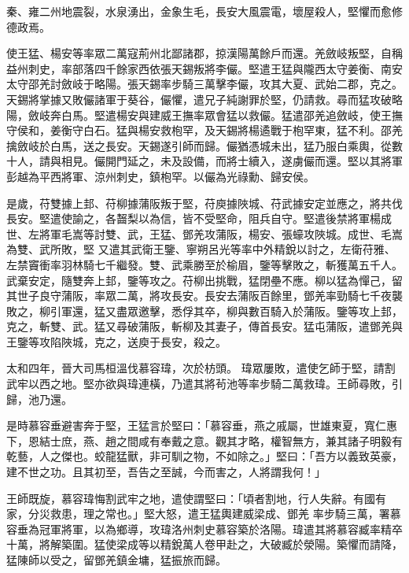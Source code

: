 \begin{pinyinscope}
 秦、雍二州地震裂，水泉湧出，金象生毛，長安大風震電，壞屋殺人，堅懼而愈修德政焉。



 使王猛、楊安等率眾二萬寇荊州北鄙諸郡，掠漢陽萬餘戶而還。羌斂岐叛堅，自稱益州刺史，率部落四千餘家西依張天錫叛將李儼。堅遣王猛與隴西太守姜衡、南安太守邵羌討斂岐于略陽。張天錫率步騎三萬擊李儼，攻其大夏、武始二郡，克之。天錫將掌據又敗儼諸軍于葵谷，儼懼，遣兄子純謝罪於堅，仍請救。尋而猛攻破略陽，斂岐奔白馬。堅遣楊安與建威王撫率眾會猛以救儼。猛遣邵羌追斂岐，使王撫
 守侯和，姜衡守白石。猛與楊安救枹罕，及天錫將楊遹戰于枹罕東，猛不利。邵羌擒斂岐於白馬，送之長安。天錫遂引師而歸。儼猶憑城未出，猛乃服白乘輿，從數十人，請與相見。儼開門延之，未及設備，而將士續入，遂虜儼而還。堅以其將軍彭越為平西將軍、涼州刺史，鎮枹罕。以儼為光祿勳、歸安侯。



 是歲，苻雙據上邽、苻柳據蒲阪叛于堅，苻庾據陜城、苻武據安定並應之，將共伐長安。堅遣使諭之，各齧梨以為信，皆不受堅命，阻兵自守。堅遣後禁將軍楊成世、左將軍毛嵩等討雙、武，王猛、鄧羌攻蒲阪，楊安、張蠔攻陜城。成世、毛嵩為雙、武所敗，堅
 又遣其武衛王鑒、寧朔呂光等率中外精銳以討之，左衛苻雅、左禁竇衝率羽林騎七千繼發。雙、武乘勝至於榆眉，鑒等擊敗之，斬獲萬五千人。武棄安定，隨雙奔上邽，鑒等攻之。苻柳出挑戰，猛閉壘不應。柳以猛為憚己，留其世子良守蒲阪，率眾二萬，將攻長安。長安去蒲阪百餘里，鄧羌率勁騎七千夜襲敗之，柳引軍還，猛又盡眾邀擊，悉俘其卒，柳與數百騎入於蒲阪。鑒等攻上邽，克之，斬雙、武。猛又尋破蒲阪，斬柳及其妻子，傳首長安。猛屯蒲阪，遣鄧羌與王鑒等攻陷陜城，克之，送庾于長安，殺之。



 太和四年，晉大司馬桓溫伐慕容瑋，次於枋頭。
 瑋眾屢敗，遣使乞師于堅，請割武牢以西之地。堅亦欲與瑋連橫，乃遣其將茍池等率步騎二萬救瑋。王師尋敗，引歸，池乃還。



 是時慕容垂避害奔于堅，王猛言於堅曰：「慕容垂，燕之戚屬，世雄東夏，寬仁惠下，恩結士庶，燕、趙之間咸有奉戴之意。觀其才略，權智無方，兼其諸子明毅有乾藝，人之傑也。蛟龍猛獸，非可馴之物，不如除之。」堅曰：「吾方以義致英豪，建不世之功。且其初至，吾告之至誠，今而害之，人將謂我何！」



 王師既旋，慕容瑋悔割武牢之地，遣使謂堅曰：「頃者割地，行人失辭。有國有家，分災救患，理之常也。」堅大怒，遣王猛輿建威梁成、鄧羌
 率步騎三萬，署慕容垂為冠軍將軍，以為鄉導，攻瑋洛州刺史慕容築於洛陽。瑋遣其將慕容臧率精卒十萬，將解築圍。猛使梁成等以精銳萬人卷甲赴之，大破臧於滎陽。築懼而請降，猛陳師以受之，留鄧羌鎮金墉，猛振旅而歸。




\end{pinyinscope}
